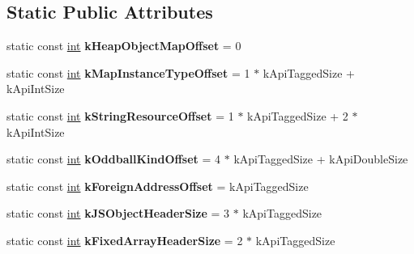 \subsection*{Static Public Attributes}
\begin{DoxyCompactItemize}
\item 
\mbox{\label{classv8_1_1internal_1_1Internals_a0902a596b5656b4592157eaacc020512}} 
static const \mbox{\hyperlink{classint}{int}} {\bfseries k\+Heap\+Object\+Map\+Offset} = 0
\item 
\mbox{\label{classv8_1_1internal_1_1Internals_a39ea290dfaa9de300bd79aa73a874a88}} 
static const \mbox{\hyperlink{classint}{int}} {\bfseries k\+Map\+Instance\+Type\+Offset} = 1 $\ast$ k\+Api\+Tagged\+Size + k\+Api\+Int\+Size
\item 
\mbox{\label{classv8_1_1internal_1_1Internals_a8c2b35069864f567ca0c571310dd90a1}} 
static const \mbox{\hyperlink{classint}{int}} {\bfseries k\+String\+Resource\+Offset} = 1 $\ast$ k\+Api\+Tagged\+Size + 2 $\ast$ k\+Api\+Int\+Size
\item 
\mbox{\label{classv8_1_1internal_1_1Internals_a98685d6861a07139720cd296f94f2b73}} 
static const \mbox{\hyperlink{classint}{int}} {\bfseries k\+Oddball\+Kind\+Offset} = 4 $\ast$ k\+Api\+Tagged\+Size + k\+Api\+Double\+Size
\item 
\mbox{\label{classv8_1_1internal_1_1Internals_ad4134449ee39b95e5ac035996aa7d66b}} 
static const \mbox{\hyperlink{classint}{int}} {\bfseries k\+Foreign\+Address\+Offset} = k\+Api\+Tagged\+Size
\item 
\mbox{\label{classv8_1_1internal_1_1Internals_af8faf3ff3271d26bafa6ca0ea87e2a57}} 
static const \mbox{\hyperlink{classint}{int}} {\bfseries k\+J\+S\+Object\+Header\+Size} = 3 $\ast$ k\+Api\+Tagged\+Size
\item 
\mbox{\label{classv8_1_1internal_1_1Internals_a715ca62a5ddceac28d43c470db067675}} 
static const \mbox{\hyperlink{classint}{int}} {\bfseries k\+Fixed\+Array\+Header\+Size} = 2 $\ast$ k\+Api\+Tagged\+Size

\end{DoxyCompactItemize}
